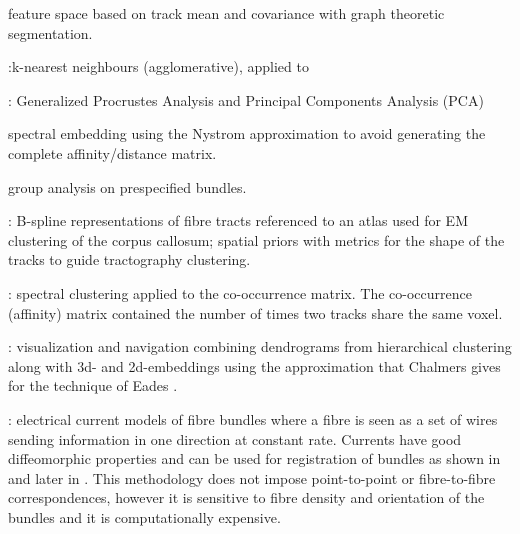 \documentclass[preprint,authoryear,a4paper,10pt,onecolumn]{elsarticle}
\begin{document}
\citet{brun2004clustering} feature space based on track mean and covariance 
with graph theoretic segmentation. 

\citet{Ding2003a}:k-nearest neighbours (agglomerative), applied to

\citet{corouge2004towards, Corouge2004, Corouge2006}: Generalized Procrustes Analysis and Principal
Components Analysis (PCA)

\citet{ODonnell_IEEETMI07} spectral embedding using the Nystrom
approximation to avoid generating the complete affinity/distance matrix.

\citet{o2009tract} group analysis on prespecified bundles.

\citet{Maddah_MICCA2005, maddah2006statistical, Maddah_IEEEBI2008}:
B-spline representations of fibre tracts referenced to an atlas used for
EM clustering of the corpus callosum; spatial priors with metrics for
the shape of the tracks to guide tractography clustering.

\citet{jonasson2005fiber}: spectral clustering applied to the
co-occurrence matrix. The co-occurrence (affinity) matrix contained the
number of times two tracks share the same voxel. 

\citet{jianu2009exploring}: visualization and navigation combining
dendrograms from hierarchical clustering along with 3d- and
2d-embeddings using the approximation that Chalmers
\citet{chalmers1996linear} gives for the technique of Eades
\citet{eades1984heuristic}.

\citet{Durrleman2009}: electrical current models of
fibre bundles where a fibre is seen as a set of wires sending
information in one direction at constant rate. Currents have good
diffeomorphic properties and can be used for registration of bundles as
shown in \citet{Durrleman2009} and later in \citet{durrleman2010registration}. This
methodology does not impose point-to-point or fibre-to-fibre
correspondences, however it is sensitive to fibre density and
orientation of the bundles and it is computationally expensive.

\end{document}
